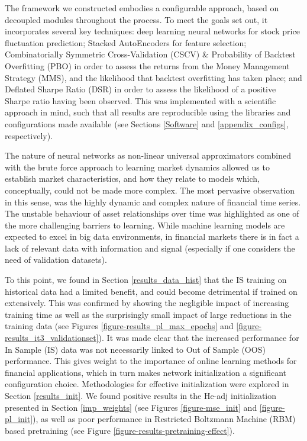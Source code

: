 \documentclass[a4paper,11pt,oneside]{article}
\theoremstyle{plain}
\theoremstyle{definition}
\begin{document}
	The framework we constructed embodies a configurable approach, based on decoupled modules throughout the process. To meet the goals set out, it incorporates several key techniques: deep learning neural networks for stock price fluctuation prediction; Stacked AutoEncoders for feature selection; Combinatorially Symmetric Cross-Validation (CSCV) \& Probability of Backtest Overfitting (PBO) in order to assess the returns from the Money Management Strategy (MMS), and the likelihood that backtest overfitting has taken place; and Deflated Sharpe Ratio (DSR) in order to assess the likelihood of a positive Sharpe ratio having been observed. This was implemented with a scientific approach in mind, such that all results are reproducible using the libraries and configurations made available (see Sections \ref{Software} and \ref{appendix_configs}, respectively). \newline 
	
	The nature of neural networks as non-linear universal approximators combined with the brute force approach to learning market dynamics allowed us to establish market characteristics, and how they relate to models which, conceptually, could not be made more complex. The most pervasive observation in this sense, was the highly dynamic and complex nature of financial time series. The unstable behaviour of asset relationships over time was highlighted as one of the more challenging barriers to learning. While machine learning models are expected to excel in big data environments, in financial markets there is in fact a lack of relevant data with information and signal (especially if one considers the need of validation datasets). \newline
	
	To this point, we found in Section \ref{results_data_hist} that the IS training on historical data had a limited benefit, and could become detrimental if trained on extensively. This was confirmed by showing the negligible impact of increasing training time as well as the surprisingly small impact of large reductions in the training data (see Figures \ref{figure-results_pl_max_epochs} and \ref{figure-results_it3_validationset}). It was made clear that the increased performance for In Sample (IS) data was not necessarily linked to Out of Sample (OOS) performance. This gives weight to the importance of online learning methods for financial applications, which in turn makes network initialization a significant configuration choice. Methodologies for effective initialization were explored in Section \ref{results_init}. We found positive results in the He-adj initialization presented in Section \ref{imp_weights} (see Figures \ref{figure-mse_init} and \ref{figure-pl_init}), as well as poor performance in Restricted Boltzmann Machine (RBM) based pretraining (see Figure \ref{figure-results-pretraining-effect}).  \newline
	
\end{document}
